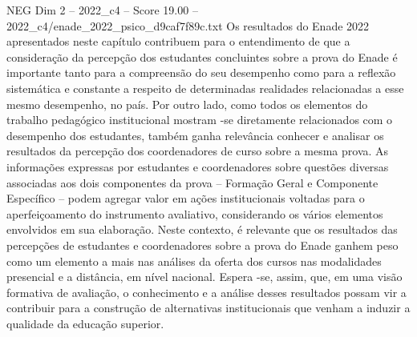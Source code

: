 \begin{textsample}{NEG Dim 2 – 2022\_c4 – Score 19.00 – 2022\_c4/enade\_2022\_psico\_d9caf7f89c.txt}
Os resultados do Enade 2022 apresentados neste capítulo contribuem para o entendimento de que a consideração da percepção dos estudantes concluintes sobre a prova do Enade é importante tanto para a compreensão do seu desempenho como para a reflexão sistemática e constante a respeito de determinadas realidades relacionadas a esse mesmo desempenho, no país.
Por outro lado, como todos os elementos do trabalho pedagógico institucional mostram -se diretamente relacionados com o desempenho dos estudantes, também ganha relevância conhecer e analisar os resultados da percepção dos coordenadores de curso sobre a mesma prova.
As informações expressas por estudantes e coordenadores sobre questões diversas associadas aos dois componentes da prova – Formação Geral e Componente Específico – podem agregar valor em ações institucionais voltadas para o aperfeiçoamento do instrumento avaliativo, considerando os vários elementos envolvidos em sua elaboração.
Neste contexto, é relevante que os resultados das percepções de estudantes e coordenadores sobre a prova do Enade ganhem peso como um elemento a mais nas análises da oferta dos cursos nas modalidades presencial e a distância, em nível nacional.
Espera -se, assim, que, em uma visão formativa de avaliação, o conhecimento e a análise desses resultados possam vir a contribuir para a construção de alternativas institucionais que venham a induzir a qualidade da educação superior.

\end{textsample}
